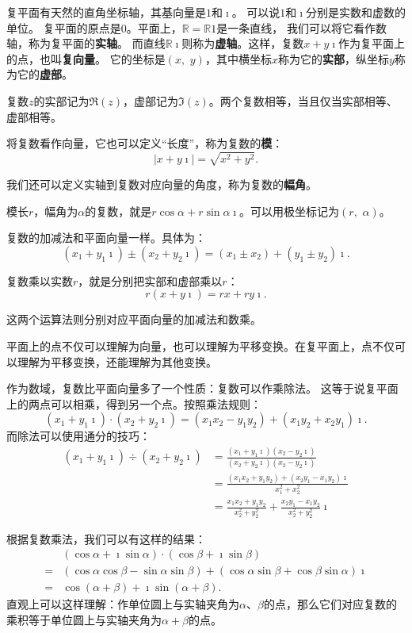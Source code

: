 \documentclass[12pt,UTF8]{ctexbook}
\begin{document}
复平面有天然的直角坐标轴，其基向量是$1$和$\imath$。
可以说$1$和$\imath$分别是实数和虚数的单位。
复平面的原点是$0$。平面上，$\mathbb{R} = \mathbb{R}1$是一条直线，
我们可以将它看作数轴，称为复平面的\textbf{实轴}。
而直线$\mathbb{R}\imath$则称为\textbf{虚轴}。这样，复数$x+y\imath$作为复平面上的点，也叫\textbf{复向量}。
它的坐标是$(x,\,\,y)$，其中横坐标$x$称为它的\textbf{实部}，纵坐标$y$称为它的\textbf{虚部}。

复数$z$的实部记为$\Re(z)$，虚部记为$\Im(z)$。两个复数相等，当且仅当实部相等、虚部相等。

将复数看作向量，它也可以定义“长度”，称为复数的\textbf{模}：
$$ |x + y\imath| = \sqrt{x^2 + y^2}.$$

我们还可以定义实轴到复数对应向量的角度，称为复数的\textbf{幅角}。

模长$r$，幅角为$\alpha$的复数，就是$r\cos{\alpha} + r\sin{\alpha}\imath$。可以用极坐标记为$(r,\,\,\alpha)$。

复数的加减法和平面向量一样。具体为：
$$ (x_1 + y_1\imath) \pm (x_2 + y_2\imath) = (x_1 \pm x_2) + (y_1 \pm y_2)\imath. $$

复数乘以实数$r$，就是分别把实部和虚部乘以$r$：
$$ r(x + y\imath) = rx + ry\imath. $$

这两个运算法则分别对应平面向量的加减法和数乘。

平面上的点不仅可以理解为向量，也可以理解为平移变换。在复平面上，点不仅可以理解为平移变换，还能理解为其他变换。

作为数域，复数比平面向量多了一个性质：复数可以作乘除法。
这等于说复平面上的两点可以相乘，得到另一个点。按照乘法规则：
$$ (x_1 + y_1\imath) \cdot (x_2 + y_2\imath) = (x_1x_2 - y_1y_2) + (x_1y_2 + x_2y_1)\imath. $$
而除法可以使用通分的技巧：
\begin{align*}
    (x_1 + y_1\imath) \div (x_2 + y_2\imath) &= \frac{(x_1 + y_1\imath)(x_2 - y_2\imath)}{(x_2 + y_2\imath)(x_2 - y_2\imath)} \\
    &= \frac{(x_1x_2 + y_1y_2) + (x_2y_1 - x_1y_2)\imath}{x_1^2 + x_2^2} \\
    &= \frac{x_1x_2 + y_1y_2}{x_2^2 + y_2^2} + \frac{x_2y_1 - x_1y_2}{x_2^2 + y_2^2}\imath
\end{align*}

根据复数乘法，我们可以有这样的结果：
\begin{align*}
     & (\cos{\alpha} + \imath\sin{\alpha}) \cdot (\cos{\beta} + \imath\sin{\beta}) \\
    =& (\cos{\alpha}\cos{\beta} - \sin{\alpha}\sin{\beta}) + (\cos{\alpha}\sin{\beta} + \cos{\beta}\sin{\alpha})\imath \\
    =& \cos{(\alpha + \beta)} + \imath\sin{(\alpha + \beta)}.
\end{align*}
直观上可以这样理解：作单位圆上与实轴夹角为$\alpha$、$\beta$的点，那么它们对应复数的乘积等于单位圆上与实轴夹角为$\alpha+\beta$的点。
\end{document}
